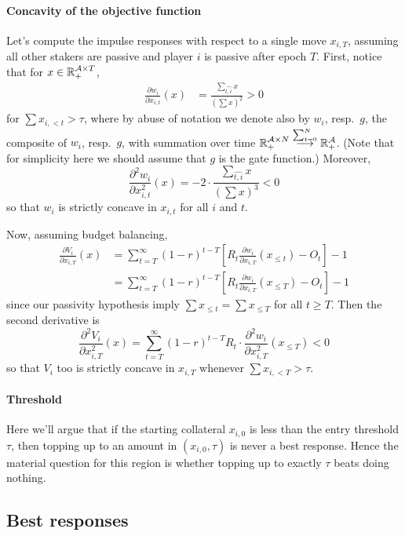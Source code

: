 \paragraph{Concavity of the objective function}
Let's compute the impulse responses with respect to a single move $x_{i,T}$, assuming all other stakers are passive and player $i$ is passive after epoch $T$.
%
First, notice that for $x\in\mathbb{R}_+^{\mathcal{A}\times T}$,
\begin{align*}
  \frac{\partial w_i}{\partial x_{i,t}}(x) &= \frac{\sum_{\widehat{t,i}} x}{(\sum x)^2} > 0
\end{align*}
for $\sum x_{i,<t}>\tau$, where by abuse of notation we denote also by $w_i$, resp.~$g$, the composite of $w_i$, resp.~$g$, with summation over time $\mathbb{R}_+^{\mathcal{A}\times N}\stackrel{\sum_{t=0}^N}{\longrightarrow}\mathbb{R}_+^{\mathcal{A}}$.
%
(Note that for simplicity here we should assume that $g$ is the gate function.)
%
Moreover, 
\[
  \frac{\partial^2 w_i}{\partial x_{i,t}^2}(x) = -2\cdot\frac{\sum_{\widehat{t,i}} x}{(\sum x)^3} < 0
\]
so that $w_i$ is strictly concave in $x_{i,t}$ for all $i$ and $t$.

Now, assuming budget balancing,
%
\begin{align*}
  \frac{\partial V_i}{\partial x_{i,T}}(x) &= \sum_{t=T}^\infty (1-r)^{t-T}\left[ R_t\frac{\partial w_i}{\partial x_{i,T}}(x_{\leq t}) - O_t \right] - 1\\
  &= \sum_{t=T}^\infty (1-r)^{t-T}\left[ R_t\frac{\partial w_i}{\partial x_{i,T}}(x_{\leq T}) - O_t \right] - 1
\end{align*}
since our passivity hypothesis imply $\sum x_{\leq t}=\sum x_{\leq T}$ for all $t\geq T$.
%
Then the second derivative is
\[
  \frac{\partial^2 V_i}{\partial x_{i,T}^2}(x) = \sum_{t=T}^\infty (1-r)^{t-T} R_t \cdot\frac{\partial^2 w_i}{\partial x_{i,T}^2}(x_{\leq T}) < 0
\]
so that $V_i$ too is strictly concave in $x_{i,T}$ whenever $\sum x_{i,<T}>\tau$.

\paragraph{Threshold}
Here we'll argue that if the starting collateral $x_{i,0}$ is less than the entry threshold $\tau$, then topping up to an amount in $(x_{i,0},\tau)$ is never a best response.
%
Hence the material question for this region is whether topping up to exactly $\tau$ beats doing nothing.


\subsection{Best responses}

